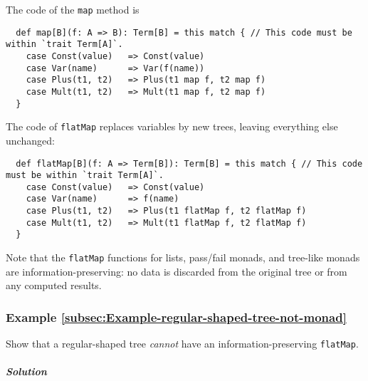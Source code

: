The code of the \lstinline!map! method is
\begin{lstlisting}
  def map[B](f: A => B): Term[B] = this match { // This code must be within `trait Term[A]`.
    case Const(value)   => Const(value)
    case Var(name)      => Var(f(name))
    case Plus(t1, t2)   => Plus(t1 map f, t2 map f)
    case Mult(t1, t2)   => Mult(t1 map f, t2 map f)
  }
\end{lstlisting}
The code of \lstinline!flatMap! replaces variables by new trees,
leaving everything else unchanged:
\begin{lstlisting}
  def flatMap[B](f: A => Term[B]): Term[B] = this match { // This code must be within `trait Term[A]`.
    case Const(value)   => Const(value)
    case Var(name)      => f(name)
    case Plus(t1, t2)   => Plus(t1 flatMap f, t2 flatMap f)
    case Mult(t1, t2)   => Mult(t1 flatMap f, t2 flatMap f)
  }
\end{lstlisting}

Note that the \lstinline!flatMap! functions for lists, pass/fail
monads, and tree-like monads are information-preserving: no data is
discarded from the original tree or from any computed results.

\subsubsection{Example \label{subsec:Example-regular-shaped-tree-not-monad}\ref{subsec:Example-regular-shaped-tree-not-monad}}

Show that a regular-shaped tree \emph{cannot} have an information-preserving
\lstinline!flatMap!.

\subparagraph{Solution}

